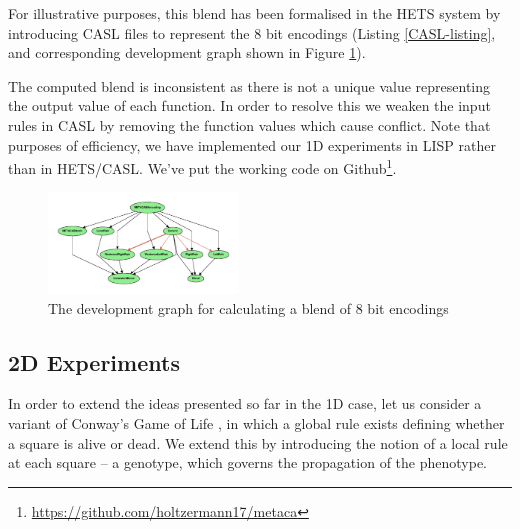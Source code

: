\documentclass{AISB2008}
\begin{document}
For illustrative purposes, this blend has been formalised in the HETS
system by introducing CASL files to represent the 8 bit encodings
(Listing \ref{CASL-listing}, and corresponding development graph shown
in Figure \ref{fig:hetsblend}).
%

The computed blend is inconsistent as there is not a unique value
representing the output value of each function.  In order to resolve
this we weaken the input rules in CASL by removing the function values
which cause conflict. 
%
Note that purposes of efficiency, we have implemented our 1D
experiments in LISP rather than in \mbox{HETS}/\mbox{CASL}.  We've put
the working code on
Github\footnote{\url{https://github.com/holtzermann17/metaca}}.

\begin{figure}[!ht]
\includegraphics[width=0.45\textwidth]{dol_dev.pdf}
\caption{The development graph for calculating a blend of 8 bit encodings\label{fig:hetsblend}}
\end{figure}


\subsection{2D Experiments} \label{2d-experiments-design}



In order to extend the ideas presented so far in the 1D case, let us
consider a variant of Conway's Game of Life \cite{conway}, in which a
global rule exists defining whether a square is alive or dead.  We
extend this by introducing the notion of a local rule at each square
-- a genotype, which governs the propagation of the phenotype.
\end{document}
